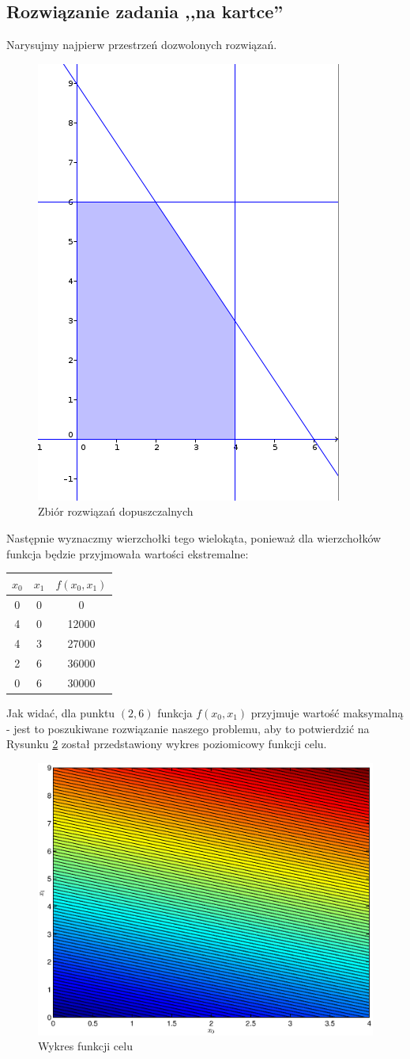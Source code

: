 \documentclass[10pt,a4paper]{article}
\begin{document}
\subsection{Rozwiązanie zadania ,,na kartce''}

Narysujmy najpierw przestrzeń dozwolonych rozwiązań. 
\begin{figure}[H]
\centering
\includegraphics[width=0.3\linewidth]{./Wykresy/obszar}
\caption{Zbiór rozwiązań dopuszczalnych}
\label{fig:obszar}
\end{figure}

Następnie wyznaczmy wierzchołki tego wielokąta, ponieważ dla wierzchołków funkcja
będzie przyjmowała wartości ekstremalne:

\begin{table}[ht]
\centering
\begin{tabular}{|c|c|c|}
\hline
$x_0$ & $x_1$ & $f(x_0,x_1)$ \\
\hline
0 & 0 & 0 \\
\hline
4 & 0 & 12000 \\
\hline
4 & 3 & 27000 \\
\hline
2 & 6 & 36000 \\
\hline
0 & 6 & 30000 \\
\hline
\end{tabular}
\end{table}

Jak widać, dla punktu $(2,6)$ funkcja $f(x_0,x_1)$ przyjmuje wartość maksymalną - jest to 
poszukiwane rozwiązanie naszego problemu, aby to potwierdzić na Rysunku \ref{fig:wykres} został 
przedstawiony wykres poziomicowy funkcji celu.

\begin{figure}
\centering
\includegraphics[width=0.7\linewidth]{./Wykresy/wykres}
\caption{Wykres funkcji celu}
\label{fig:wykres}
\end{figure}
\end{document}
